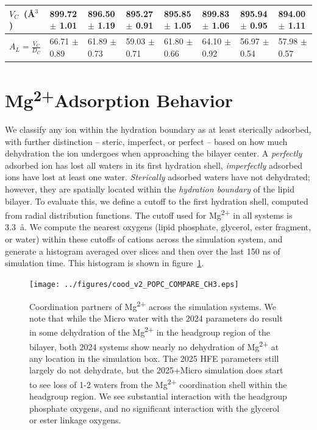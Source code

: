 \documentclass[12pt,openany,final]{book}
\newcommand{\mg}{Mg\textsuperscript{2+}}
\begin{document}
\begin{table}[H]
{\begin{tabularx}{\textwidth}{X|X|X|X|X|X|X|X|}
    $V_C$~(\AA$^3$)                & 899.72 $\pm$ 1.01        & 896.50  $\pm$ 1.19               & 895.27 $\pm$ 0.91  & 895.85 $\pm$ 1.05  & 899.83 $\pm$ 1.06  & 895.94 $\pm$ 0.95  & 894.00 $\pm$ 1.11\\\hline
    $A_L=\frac{V_C}{D_C}$          & 66.71 $\pm$ 0.89         & 61.89 $\pm$ 0.73                 & 59.03 $\pm$ 0.71   & 61.80 $\pm$ 0.66   & 64.10 $\pm$ 0.92   & 56.97 $\pm$ 0.54   & 57.98 $\pm$ 0.57\\\hline
    \end{tabularx}
}
\end{table}
\section{\mg Adsorption Behavior}
We classify any ion within the hydration boundary as at least sterically adsorbed, with further distinction -- steric, imperfect, or perfect -- based on how much dehydration the ion undergoes when approaching the bilayer center. A \emph{perfectly} adsorbed ion has lost all waters in its first hydration shell, \emph{imperfectly} adsorbed ions
have lost at least one water. {\emph{Sterically} adsorbed} waters have not dehydrated; however, they are spatially located within the \emph{hydration boundary} of the lipid bilayer. To evaluate this, we define a cutoff to the first hydration shell,
computed from radial distribution functions. The cutoff used for \mg{} in all systems is 3.3~\aa. We compute the nearest oxygens (lipid phosphate, glycerol, ester fragment, or water) within these
cutoffs of cations across the simulation system, and generate a histogram averaged over slices and then over the last 150 ns of simulation time. This histogram is shown in
figure~\ref{fig:ioncoordination}.
\begin{figure}[H]
    \caption[Ion coordination summary]{Coordination partners of \mg{} across the simulation systems. We note that while the Micro water with the 2024 parameters do result in some dehydration
        of the \mg{} in the headgroup region of the bilayer, both 2024 systems show nearly no dehydration of \mg{} at any location in the simulation box. The 2025 HFE parameters
        still largely do not dehydrate, but the 2025+Micro simulation does start to see loss of 1-2 waters from the \mg{} coordination shell within the headgroup region.
    We see substantial interaction with the headgroup phosphate oxygens, and no significant interaction with the glycerol or ester linkage oxygens.}
\label{fig:ioncoordination}
\texttt{[image: ../figures/cood\_v2\_POPC\_COMPARE\_CH3.eps]}
\end{figure}
\end{document}

